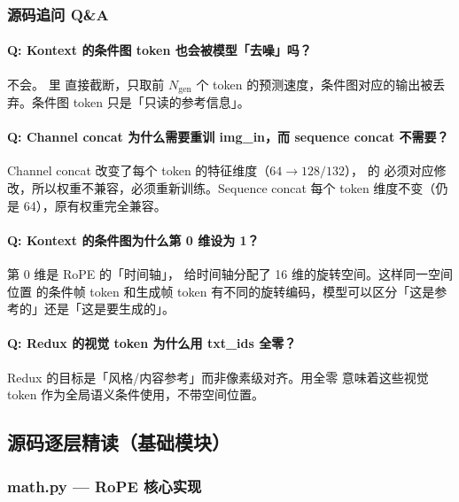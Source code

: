 \subsubsection{源码追问 Q\&A}

\paragraph{Q: Kontext 的条件图 token 也会被模型「去噪」吗？}
不会。 里  直接截断，只取前 $N_\text{gen}$ 个 token 的预测速度，条件图对应的输出被丢弃。条件图 token 只是「只读的参考信息」。

\paragraph{Q: Channel concat 为什么需要重训 img\_in，而 sequence concat 不需要？}
Channel concat 改变了每个 token 的特征维度（$64 \to 128/132$）， 的  必须对应修改，所以权重不兼容，必须重新训练。Sequence concat 每个 token 维度不变（仍是 64），原有权重完全兼容。

\paragraph{Q: Kontext 的条件图为什么第 0 维设为 1？}
第 0 维是 RoPE 的「时间轴」， 给时间轴分配了 16 维的旋转空间。这样同一空间位置  的条件帧 token 和生成帧 token 有不同的旋转编码，模型可以区分「这是参考的」还是「这是要生成的」。

\paragraph{Q: Redux 的视觉 token 为什么用 txt\_ids 全零？}
Redux 的目标是「风格/内容参考」而非像素级对齐。用全零  意味着这些视觉 token 作为全局语义条件使用，不带空间位置。

\subsection{源码逐层精读（基础模块）}

\subsubsection{math.py — RoPE 核心实现}

